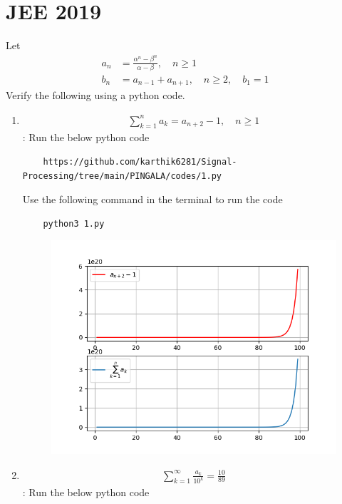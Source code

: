\documentclass[journal,12pt,twocolumn]{IEEEtran}
\renewcommand\thesection{\arabic{section}}
\begin{document}
\section{JEE 2019}
Let 
\begin{align}
a_n &= \frac{\alpha^{n}-\beta^{n}}{\alpha - \beta}, \quad n \ge 1
\\
b_n &= a_{n-1} + a_{n+1}, \quad n \ge 2, \quad b_1 =1
\label{eq:10-orig-diff}
\end{align}
Verify the following using a python code.
\begin{enumerate}[label=\thesection.\arabic*
,ref=\thesection.\theenumi]
\item 
\begin{align}
	\sum_{k=1}^{n}a_k = a_{n+2}-1, \quad n \ge 1
\end{align}
\solution:
Run the below python code 
\begin{lstlisting}
	https://github.com/karthik6281/Signal-Processing/tree/main/PINGALA/codes/1.py
\end{lstlisting}
Use the following command in the terminal to run the code
\begin{lstlisting}
	python3 1.py
\end{lstlisting}
\begin{figure}[h]
	\centering
	\includegraphics[scale=0.6]{./figs/1_1.png}
	\caption{}
\end{figure}
\item 
\begin{align}
	\sum_{k=1}^{\infty}\frac{a_k}{10^k} =\frac{10}{89}
\end{align}
\solution:
Run the below python code 

\end{enumerate}
\end{document}
